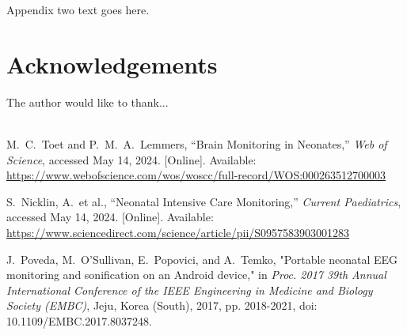 \documentclass[12pt,journal,compsoc]{IEEEtran}
\begin{document}
\section{}
Appendix two text goes here.


\section*{Acknowledgements}

The author would like to thank...\\ \\

\begin{thebibliography}{1}

M.~C.~Toet and P.~M.~A.~Lemmers, “Brain Monitoring in Neonates,” \emph{Web of Science}, accessed May 14, 2024. [Online]. Available: \url{https://www.webofscience.com/wos/woscc/full-record/WOS:000263512700003}

S.~Nicklin, A.~et al., “Neonatal Intensive Care Monitoring,” \emph{Current Paediatrics}, accessed May 14, 2024. [Online]. Available: \url{https://www.sciencedirect.com/science/article/pii/S0957583903001283}

J.~Poveda, M.~O'Sullivan, E.~Popovici, and A.~Temko, "Portable neonatal EEG monitoring and sonification on an Android device," in \emph{Proc. 2017 39th Annual International Conference of the IEEE Engineering in Medicine and Biology Society (EMBC)}, Jeju, Korea (South), 2017, pp. 2018-2021, doi: 10.1109/EMBC.2017.8037248.

\end{thebibliography}
\end{document}

